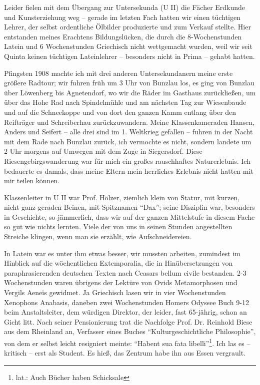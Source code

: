 \documentclass[a5paper,pagesize,10pt,twoside=true]{scrbook}
\begin{document}
Leider fielen mit dem Übergang zur Untersekunda (U II) die Fächer Erdkunde und Kunsterziehung weg -- gerade im letzten Fach hatten wir einen tüchtigen Lehrer, der selbst ordentliche Ölbilder produzierte und zum Verkauf stellte. Hier entstanden meines Erachtens Bildungslücken, die durch die 8-Wochenstunden Latein und 6 Wochenstunden Griechisch nicht wettgemacht wurden, weil wir seit Quinta keinen tüchtigen Lateinlehrer -- besonders nicht in Prima -- gehabt hatten.

Pfingsten 1908 machte ich mit drei anderen Untersekundanern meine erste größere Radtour; wir fuhren früh um 3 Uhr von Bunzlau los, es ging von Bunzlau über Löwenberg bis Agnetendorf, wo wir die Räder im Gasthaus zurückließen, um über das Hohe Rad nach Spindelmühle und am nächsten Tag zur Wiesenbaude und auf die Schneekoppe und von dort den ganzen Kamm entlang über den Reifträger und Schreiberhau zurückzuwandern. Meine Klassenkameraden Hansen, Anders und Seifert -- alle drei sind im 1. Weltkrieg gefallen -- fuhren in der Nacht mit dem Rade nach Bunzlau zurück, ich vermochte es nicht, sondern landete um 2 Uhr morgens auf Umwegen mit dem Zuge in Siegersdorf. Diese Riesengebirgswanderung war für mich ein großes rauschhaftes Naturerlebnis. Ich bedauerte es damals, dass meine Eltern mein herrliches Erlebnis nicht hatten mit mir teilen können.

Klassenleiter in U II war Prof. Hölzer, ziemlich klein von Statur, mit kurzen, nicht ganz geraden Beinen, mit Spitznamen \enquote{Dax}; seine Disziplin war, besonders in Geschichte, so jämmerlich, dass wir auf der ganzen Mittelstufe in diesem Fache so gut wie nichts lernten. Viele der von uns in seinen Stunden angestellten Streiche klingen, wenn man sie erzählt, wie Aufschneidereien.

In Latein war es unter ihm etwas besser, wir mussten arbeiten, zumindest im Hinblick auf die wöchentlichen Extemporalia, die in Hinübersetzungen von paraphrasierenden deutschen Texten nach Ceasars bellum civile bestanden. 2-3 Wochenstunden waren übrigens der Lektüre von Ovids Metamorphosen und Vergils Aeneïs gewidmet. Ja Griechisch lasen wir in vier Wochenstunden Xenophons Anabasis, daneben zwei Wochenstunden Homers Odyssee Buch 9-12 beim Anstaltsleiter, dem würdigen Direktor, der leider, fast 65-jährig, schon an Gicht litt. Nach seiner Pensionierung trat die Nachfolge Prof. Dr. Reinhold Biese aus dem Rheinland an, Verfasser eines Buches \enquote{Kulturgeschichtliche Philosophie}, von dem er selbst leicht resigniert meinte: \enquote{Habent sua fata libelli}\footnote{lat.: Auch Bücher haben Schicksale}. Ich las es -- kritisch -- erst als Student. Es hieß, das Zentrum habe ihn aus Essen vergrault.
\end{document}
